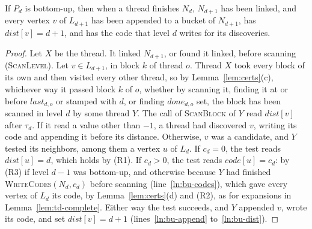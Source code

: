 \begin{lemma}
\label{lem:bu-complete}
If $P_d$ is bottom-up, then when a thread finishes $N_d$, $N_{d+1}$ has been linked, and every vertex $v$ of $L_{d+1}$ has been appended to a bucket of $N_{d+1}$, has $\mathit{dist}[v] = d+1$, and has the code that level $d$ writes for its discoveries.
\end{lemma}
\begin{proof}
Let $X$ be the thread. It linked $N_{d+1}$, or found it linked, before scanning (\textsc{ScanLevel}). Let $v \in L_{d+1}$, in block $k$ of thread $o$. Thread $X$ took every block of its own and then visited every other thread, so by Lemma~\ref{lem:certs}(c), whichever way it passed block $k$ of $o$, whether by scanning it, finding it at or before $\mathit{last}_{d,o}$ or stamped with $d$, or finding $\mathit{done}_{d,o}$ set, the block has been scanned in level $d$ by some thread $Y$. The call of \textsc{ScanBlock} of $Y$ read $\mathit{dist}[v]$ after $\tau_d$. If it read a value other than $-1$, a thread had discovered $v$, writing its code and appending it before its distance. Otherwise, $v$ was a candidate, and $Y$ tested its neighbors, among them a vertex $u$ of $L_d$. If $c_d = 0$, the test reads $\mathit{dist}[u] = d$, which holds by (R1). If $c_d > 0$, the test reads $\mathit{code}[u] = c_d$: by (R3) if level $d-1$ was bottom-up, and otherwise because $Y$ had finished \textsc{WriteCodes}$(N_d, c_d)$ before scanning (line~\ref{ln:bu-codes}), which gave every vertex of $L_d$ its code, by Lemma~\ref{lem:certs}(d) and (R2), as for expansions in Lemma~\ref{lem:td-complete}. Either way the test succeeds, and $Y$ appended $v$, wrote its code, and set $\mathit{dist}[v] = d+1$ (lines~\ref{ln:bu-append} to~\ref{ln:bu-dist}).
\end{proof}

